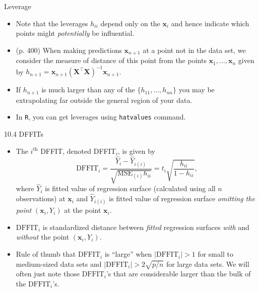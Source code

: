 \documentclass{beamer}
\begin{document}
\begin{frame}[fragile]{Leverage}
\begin{itemize}
\item Note that the leverages $h_{ii}$ depend only on the $\mathbf{x}_i$ and hence
indicate which points might \textit{potentially} be influential.
\item \pause (p. 400) When making predictions $\mathbf{x}_{n+1}$ at a point not in the
data set, we consider the measure of distance of this point from the points $\mathbf{x}_1 , \ldots, \mathbf{x}_n$ given by $h_{n+1} = \mathbf{x}_{n+1}(\mathbf{X}^\top\mathbf{X})^{-1}\mathbf{x}_{n+1}$.
\item \pause If $h_{n+1}$ is much larger than any of the $\{h_{11}, \ldots, h_{nn}\}$ you may
be extrapolating far outside the general region of your data.
\item \pause In \texttt{R}, you can get leverages using \verb|hatvalues| command.
\end{itemize}
\end{frame}

\begin{frame}{10.4 DFFITs}
\begin{itemize}
\item The $i^\text{th}$ DFFIT, denoted DFFIT$_i$, is given by
$$
\text{DFFIT}_i=\frac{\hat{Y}_i-\hat{Y}_{i(i)}}{\sqrt{\text{MSE}_{(i)}h_{ii}}}=t_i\sqrt{\frac{h_{ii}}{1-h_{ii}}},
$$
\pause where $\hat{Y}_i$ is fitted value of regression surface (calculated using all $n$ observations) at $\mathbf{x}_i$ and $\hat{Y}_{i(i)}$ is fitted value of regression surface \textit{omitting the point} $(\mathbf{x}_i, Y_i)$ at the point $\mathbf{x}_i$.
\item\pause $\text{DFFIT}_i$ is standardized distance between \textit{fitted} regression surfaces \textit{with} and \textit{without} the point $(\mathbf{x}_i, Y_i)$.
\item\pause Rule of thumb that $\text{DFFIT}_i$ is ``large'' when $|\text{DFFIT}_i|>1$ for small to medium-sized data sets and $|\text{DFFIT}_i|>2\sqrt{p/n}$ for large data sets. \pause We will often just note those $\text{DFFIT}_i$'s that are considerable larger than the bulk of the $\text{DFFIT}_i$'s.
\end{itemize}
\end{frame}
\end{document}
